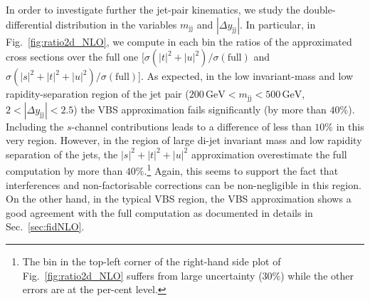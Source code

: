 \documentclass[twocolumn,epjc3]{svjour3} %
\newcommand{\Pj}{\ensuremath{\text{j}}\xspace}
\newcommand{\GeV}{\ensuremath{\,\text{GeV}}\xspace}
\begin{document}
    In order to investigate further the jet-pair kinematics, we study the double-differential distribution in the variables $m_{\Pj\Pj}$ and $|\Delta y_{\Pj\Pj}|$.
    In particular, in Fig.~\ref{fig:ratio2d_NLO}, we compute in each bin the ratios of the approximated cross sections over the full one [$\sigma(|t|^2+|u|^2)/\sigma(\textrm{full})$ and $\sigma(|s|^2+|t|^2+|u|^2)/\sigma(\textrm{full})$].
    As expected, in the low invariant-mass and low rapidity-separation region of the jet pair ($200 \GeV < m_{\Pj\Pj} < 500 \GeV$, $2<|\Delta y_{\Pj\Pj}|<2.5$) the VBS approximation fails significantly (by more than $40\%$).
    Including the $s$-channel contributions leads to a difference of less than $10\%$ in this very region.
    However, in the region of large di-jet invariant mass and low rapidity separation of the jets, the $|s|^2+|t|^2+|u|^2$ approximation overestimate the full computation by more than $40\%$.\footnote{The bin
    in the top-left corner of the right-hand side plot of Fig.~\ref{fig:ratio2d_NLO} suffers from large uncertainty ($30\%$) while the other errors are at the per-cent level.}
    Again, this seems to support the fact that interferences and non-factorisable corrections can be non-negligible in this region.
    On the other hand, in the typical VBS region, the VBS approximation shows a good agreement with the full computation as documented in details in Sec.~\ref{sec:fidNLO}.
\end{document}
